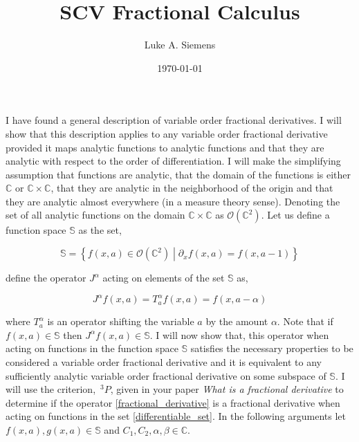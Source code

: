 \documentclass[%
 onecolumn,
 amsmath, amssymb, aps, pra, 10pt
]{revtex4-2}
\begin{document}
\title{SCV Fractional Calculus}%
\author{Luke A. Siemens}
\noaffiliation
\date{\today}
\maketitle

I have found a general description of variable order fractional derivatives. I will show that this description applies to any variable order fractional derivative provided it maps analytic functions to analytic functions and that they are analytic with respect to the order of differentiation. I will make the simplifying assumption that functions are analytic, that the domain of the functions is either $\mathbb{C}$ or $\mathbb{C} \times \mathbb{C}$, that they are analytic in the neighborhood of the origin and that they are analytic almost everywhere (in a measure theory sense). Denoting the set of all analytic functions on the domain $\mathbb{C} \times \mathbb{C}$ as $\mathcal{O}(\mathbb{C}^2)$. Let us define a function space $\mathbb{S}$ as the set,

\begin{equation}
\mathbb{S} = \left\lbrace f(x, a) \in \mathcal{O}(\mathbb{C}^2) \middle| \partial_x f(x, a) = f(x, a - 1) \right\rbrace
\label{differentiable_set}
\end{equation}

define the operator $J^{\alpha}$ acting on elements of the set $\mathbb{S}$ as,

\begin{equation}
J^{\alpha} f(x, a) = T_{a}^{\alpha} f(x, a) = f(x, a - \alpha)
\label{fractional_derivative}
\end{equation}

where $T_{a}^{\alpha}$ is an operator shifting the variable $a$ by the amount $\alpha$. Note that if $f(x, a) \in \mathbb{S}$ then $J^{\alpha} f(x, a) \in \mathbb{S}$. I will now show that, this operator when acting on functions in the function space $\mathbb{S}$ satisfies the necessary properties to be considered a variable order fractional derivative and it is equivalent to any sufficiently analytic variable order fractional derivative on some subspace of $\mathbb{S}$.
I will use the criterion, $\,^3P$, given in your paper \textit{What is a fractional derivative} \cite{ORTIGUEIRA20154} to determine if the operator \eqref{fractional_derivative} is a fractional derivative when acting on functions in the set \eqref{differentiable_set}. In the following arguments let $f(x, a), g(x, a) \in \mathbb{S}$ and $C_1, C_2, \alpha, \beta \in \mathbb{C}$.
\end{document}
